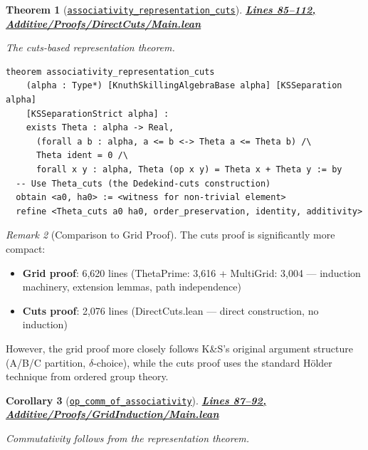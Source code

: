 \documentclass[11pt]{article}
\newtheorem{theorem}{Theorem}[section]
\newtheorem{corollary}[theorem]{Corollary}
\theoremstyle{definition}
\theoremstyle{remark}
\newtheorem{remark}[theorem]{Remark}
\begin{document}
\begin{theorem}[\href{https://github.com/zariuq/ks-foundations-of-inference/blob/main/KnuthSkilling/Additive/Proofs/DirectCuts/Main.lean\#L85}{\texttt{associativity\_representation\_cuts}}]
\textbf{\href{https://github.com/zariuq/ks-foundations-of-inference/blob/main/KnuthSkilling/Additive/Proofs/DirectCuts/Main.lean\#L85-L112}{Lines 85--112, Additive/Proofs/DirectCuts/Main.lean}}

The cuts-based representation theorem.
\end{theorem}

\begin{lstlisting}[caption={Appendix A (cuts proof)}]
theorem associativity_representation_cuts
    (alpha : Type*) [KnuthSkillingAlgebraBase alpha] [KSSeparation alpha]
    [KSSeparationStrict alpha] :
    exists Theta : alpha -> Real,
      (forall a b : alpha, a <= b <-> Theta a <= Theta b) /\
      Theta ident = 0 /\
      forall x y : alpha, Theta (op x y) = Theta x + Theta y := by
  -- Use Theta_cuts (the Dedekind-cuts construction)
  obtain <a0, ha0> := <witness for non-trivial element>
  refine <Theta_cuts a0 ha0, order_preservation, identity, additivity>
\end{lstlisting}

\begin{remark}[Comparison to Grid Proof]
The cuts proof is significantly more compact:
\begin{itemize}
\item \textbf{Grid proof}: 6,620 lines (ThetaPrime: 3,616 + MultiGrid: 3,004 --- induction machinery, extension lemmas, path independence)
\item \textbf{Cuts proof}: 2,076 lines (DirectCuts.lean --- direct construction, no induction)
\end{itemize}

However, the grid proof more closely follows K\&S's original argument structure (A/B/C partition, $\delta$-choice),
while the cuts proof uses the standard Hölder technique from ordered group theory.
\end{remark}

\begin{corollary}[\href{https://github.com/zariuq/ks-foundations-of-inference/blob/main/KnuthSkilling/Additive/Proofs/GridInduction/Main.lean\#L87}{\texttt{op\_comm\_of\_associativity}}]
\textbf{\href{https://github.com/zariuq/ks-foundations-of-inference/blob/main/KnuthSkilling/Additive/Proofs/GridInduction/Main.lean\#L87-L92}{Lines 87--92, Additive/Proofs/GridInduction/Main.lean}}

Commutativity follows from the representation theorem.
\end{corollary}
\end{document}
